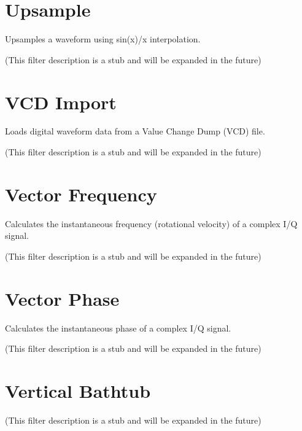 \section{Upsample}

Upsamples a waveform using sin(x)/x interpolation.

(This filter description is a stub and will be expanded in the future)

\pagebreak
\section{VCD Import}

Loads digital waveform data from a Value Change Dump (VCD) file.

(This filter description is a stub and will be expanded in the future)

\pagebreak
\section{Vector Frequency}
\label{filter:vector_frequency}

Calculates the instantaneous frequency (rotational velocity) of a complex I/Q signal.

(This filter description is a stub and will be expanded in the future)

\pagebreak
\section{Vector Phase}

Calculates the instantaneous phase of a complex I/Q signal.

(This filter description is a stub and will be expanded in the future)

\pagebreak
\section{Vertical Bathtub}

(This filter description is a stub and will be expanded in the future)

